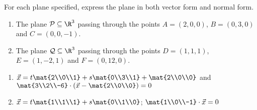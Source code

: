 \begin{exercises}
\begin{problist}
		\prob For each plane specified, express the plane in both vector form and normal form.
		\begin{enumerate}
			\item The plane $\mathcal P\subseteq\R^3$ passing through the points
			$A=(2,0,0)$, $B=(0,3,0)$ and $C=(0,0,-1)$.
			\item The plane $\mathcal Q\subseteq\R^3$ passing through the points
			$D=(1,1,1)$, $E=(1,-2,1)$ and $F=(0,12,0)$.
		\end{enumerate}
		\begin{solution}
			\begin{enumerate}
				\item $\vec x=t\mat{2\\0\\1}+s\mat{0\\3\\1}+\mat{2\\0\\0}$ and $\mat{3\\2\\-6}\cdot\left(\vec x-\mat{2\\0\\0}\right)=0$
				\item $\vec x=t\mat{1\\1\\1}+s\mat{0\\1\\0}$; $\mat{1\\0\\-1}\cdot\vec x=0$
			\end{enumerate}
		\end{solution}
		

\end{problist}
\end{exercises}
